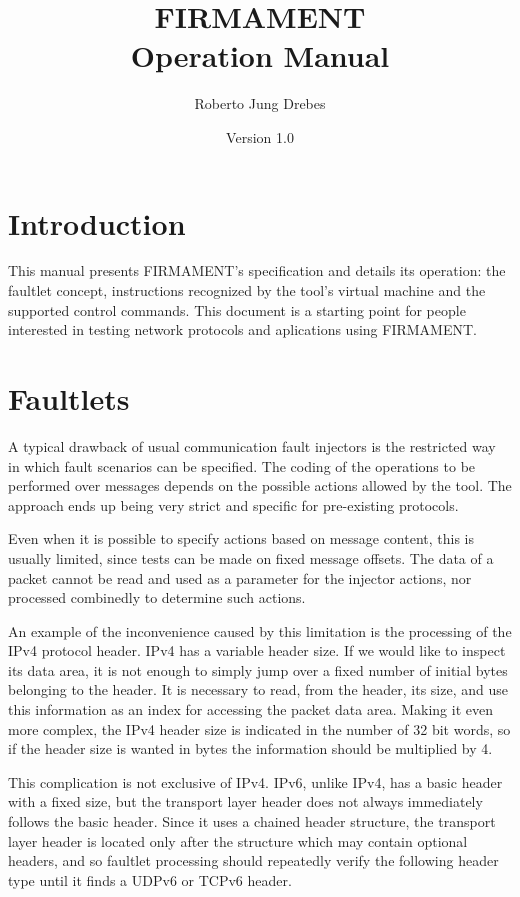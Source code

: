 \documentclass[11pt]{article}
\title{\textsf{FIRMAMENT}\\ Operation Manual}
\date{Version 1.0}
\author{Roberto Jung Drebes}
\begin{document}
\pagestyle{fancy}

\maketitle

\section{Introduction}


This manual presents \textsf{FIRMAMENT}'s specification and details its operation: the faultlet concept, instructions recognized by the tool's virtual machine and the supported control commands. This document is a starting point for people interested in testing network protocols and aplications using \textsf{FIRMAMENT}.

\section{Faultlets}\label{sec:faultlet}

A typical drawback of usual communication fault injectors is the restricted way in which fault scenarios can be specified. The coding of the operations to be performed over messages depends on the possible actions allowed by the tool. The approach ends up being very strict and specific for pre-existing protocols.

Even when it is possible to specify actions based on message content, this is usually limited, since tests can be made on fixed message offsets. The data of a packet cannot be read and used as a parameter for the injector actions, nor processed combinedly to determine such actions.

An example of the inconvenience caused by this limitation is the processing of the IPv4 protocol header. IPv4 has a variable header size. If we would like to inspect its data area, it is not enough to simply jump over a fixed number of initial bytes belonging to the header. It is necessary to read, from the header, its size, and use this information as an index for accessing the packet data area. Making it even more complex, the IPv4 header size is indicated in the number of 32 bit words, so if the header size is wanted in bytes the information should be multiplied by 4.

This complication is not exclusive of IPv4. IPv6, unlike IPv4, has a basic header with a fixed size, but the transport layer header does not always immediately follows the basic header.  Since it uses a chained header structure, the transport layer header is located only after the structure which may contain optional headers, and so faultlet processing should repeatedly verify the following header type until it finds a UDPv6 or TCPv6 header.
\end{document}
